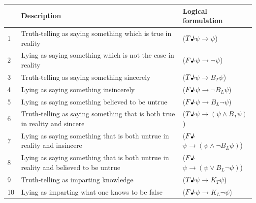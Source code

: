 \documentclass[12pt, titlepage, twoside, a4paper]{report}
\newcommand{\true}{$T\text{\textmusicalnote}$}
\newcommand{\false}{$F\text{\textmusicalnote}$}
\begin{document}
\begin{table}[h]
\begin{tabular}{lp{9cm}l}
\hline
   & Description                                                                        & Logical formulation                               \\ \hline
1  & Truth-telling as saying something which is true in reality                         & (\true$\psi \to \psi$)                            \\
2  & Lying as saying something which is not the case in reality                         & (\false$\psi \to \neg \psi$)                      \\ \hline
3  & Truth-telling as saying something sincerely                                        & (\true$\psi \to B_T \psi$)                     \\
4  & Lying as saying something insincerely                                              & (\false$\psi \to \neg B_L \psi$)               \\
5  & Lying as saying something believed to be untrue                                    & (\false$\psi \to  B_L \neg \psi$)              \\ \hline
6  & Truth-telling as saying something that is both true in reality and sincere         & (\true$\psi \to (\psi \wedge B_T \psi)$)       \\
7  & Lying as saying something that is both untrue in reality and insincere             & (\false$\psi \to (\psi \wedge \neg B_L \psi)$) \\
8  & Lying as saying something that is both untrue in reality and believed to be untrue & (\false$\psi \to (\psi \vee B_L \neg \psi)$)   \\ \hline
9  & Truth-telling as imparting knowledge                                               & (\true$\psi \to K_T \psi$)                     \\
10 & Lying as imparting what one knows to be false                                      & (\false$\psi \to K_L \neg \psi$)               \\ \hline
\end{tabular}
\end{table}
\end{document}
